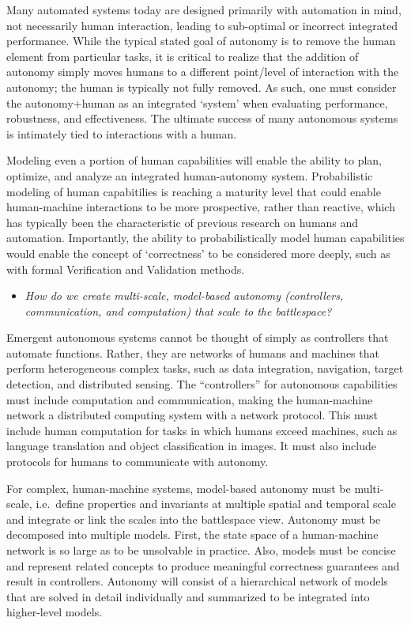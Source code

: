 
Many automated systems today are designed primarily with automation in mind, not necessarily human interaction, leading to sub-optimal or incorrect integrated performance. 
While the typical stated goal of autonomy is to remove the human element from particular tasks, it is critical to realize that the addition of autonomy simply moves humans to a different point/level of interaction with the autonomy; the human is typically not fully removed. As such, one must consider the autonomy+human as an integrated ‘system’ when evaluating performance, robustness, and effectiveness. The ultimate success of many autonomous systems is intimately tied to interactions with a human. 

Modeling even a portion of human capabilities will enable the ability to plan, optimize, and analyze an integrated human-autonomy system. Probabilistic modeling of human capabitilies is reaching a maturity level that could enable human-machine interactions to be more prospective, rather than reactive, which has typically been the characteristic of previous research on humans and automation. Importantly, the ability to probabilistically model human capabilities would enable the concept of `correctness' to be considered more deeply, such as with formal Verification and Validation methods. 

\begin{itemize}
\item {\em How do we create multi-scale, model-based autonomy (controllers, communication, and computation) that scale to the battlespace?}
\end{itemize}

Emergent autonomous systems cannot be thought of simply as controllers that automate functions.  Rather, they are networks of humans and machines that
perform heterogeneous complex tasks, such as data integration, navigation, target detection, and distributed sensing.  The ``controllers'' for 
autonomous capabilities must include computation and communication, making the human-machine network a distributed computing system with a 
network protocol.  This must include human computation for tasks in which humans exceed machines, such as language translation and 
object classification in images.  It must also include protocols for humans to communicate with autonomy. 

For complex, human-machine systems, model-based autonomy must be multi-scale, i.e.~define properties and invariants at multiple spatial and temporal scale
and integrate or link the scales into the battlespace view.  Autonomy must be decomposed into multiple models.  First, 
the state space of a human-machine network is so large as to be unsolvable in practice.  
Also, models must be concise and represent related concepts to produce meaningful correctness guarantees and result in controllers.
Autonomy will consist of a hierarchical network of models that are solved in detail individually and summarized to be integrated
into higher-level models.

